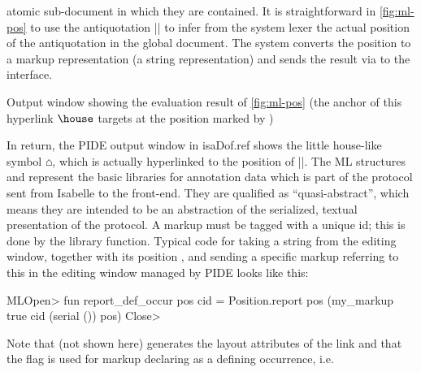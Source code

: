 \begin{isabellebody}
\begin{isamarkuptext}
atomic sub-document in which they are contained. It is straightforward in \autoref{fig:ml-pos} to
use the antiquotation \inlineisar|| to infer from the system lexer the actual position of
the antiquotation in the global document. The system converts the position to a markup
representation (a string representation) and sends the result via  to
the interface.%
\end{isamarkuptext}\isamarkuptrue%
%
\begin{isamarkupfigure*}%
[label = {hyplinkout},type = {Isa_COL.figure}, args={label = {hyplinkout},type = {Isa_COL.figure}, Isa_COL.figure.relative_width = {40}, Isa_COL.figure.src = {figures/markup-demo}, Isa_COL.figure.spawn_columns = {True}}]Output window showing the evaluation result of \autoref{fig:ml-pos} (the anchor of this hyperlink
 $\protect\house$ targets at the position marked by )%
\end{isamarkupfigure*}\isamarkuptrue%
%
\begin{isamarkuptext}%
In return, the PIDE output window in \csname isaDof.ref shows the little house-like
symbol $\house$, which is actually hyperlinked to the position of \inlineisar||. The ML
structures  and 
represent the basic libraries for annotation data which is part of the protocol sent from Isabelle
to the front-end. They are qualified as ``quasi-abstract'', which means they are intended to be an
abstraction of the serialized, textual presentation of the protocol. A markup must be tagged with a
unique id; this is done by the library  function. Typical code for taking
a string  from the editing window, together with its position
, and sending a specific markup referring to this in the editing window
managed by PIDE looks like this:
\begin{isar}
ML\<Open> fun report_def_occur pos cid = Position.report pos (my_markup true cid (serial ()) pos) \<Close>
\end{isar}
Note that  (not shown here) generates the layout attributes of the link and 
that the  flag is used for markup declaring  as a defining occurrence, i.e. 

\end{isamarkuptext}
\end{isabellebody}
